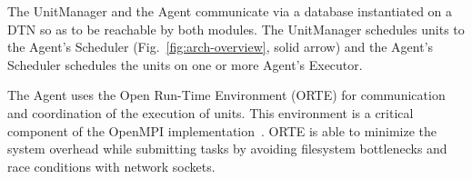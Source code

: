 The UnitManager and the Agent communicate via a database instantiated on a
DTN so as to be reachable by both modules. The UnitManager schedules units to
the Agent's Scheduler (Fig.~\ref{fig:arch-overview}, solid arrow) and the
Agent's Scheduler schedules the units on one or more Agent's Executor.

The Agent uses the Open Run-Time Environment (ORTE) for communication and
coordination of the execution of units. This environment is a critical
component of the OpenMPI implementation~\cite{castain05:_open_rte}.
ORTE is able to minimize the system overhead while submitting tasks by
avoiding filesystem bottlenecks and race conditions with network sockets.